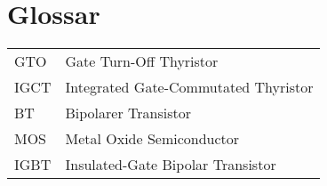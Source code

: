 \section{Glossar}
\begin{tabular}{ll}
    GTO & Gate Turn-Off Thyristor \\ 
    IGCT& Integrated Gate-Commutated Thyristor \\ 
    BT  & Bipolarer Transistor  \\ 
    MOS & Metal Oxide Semiconductor \\ 
    IGBT& Insulated-Gate Bipolar Transistor \\ 
\end{tabular} 